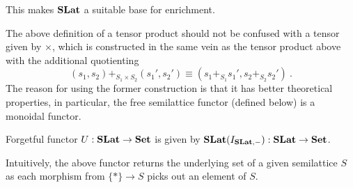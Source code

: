  This makes $\mathbf{SLat}$ a suitable base for enrichment.

\begin{remark}
    The above definition of a tensor product should not be confused with a tensor given by $\times$, which is constructed in the same vein as the tensor product above with the additional quotienting
    \[
        (s_1,s_2) +_{S_1 \times S_2} (s_1',s_2') \equiv (s_1 +_{S_1} s_1', s_2 +_{S_2} s_2')~.
    \]
    The reason for using the former construction is that it has better theoretical properties, in particular, the free semilattice functor (defined below) is a monoidal functor.
\end{remark}

\begin{definition}
	Forgetful functor $U : \mathbf{SLat} \to \mathbf{Set}$ is given by $\mathbf{SLat}(I_{\mathbf{SLat}, -}) : \mathbf{SLat} \to \mathbf{Set}$.
\end{definition}

Intuitively, the above functor returns the underlying set of a given semilattice $S$ as each morphism from $\{*\} \to S$ picks out an element of $S$.

